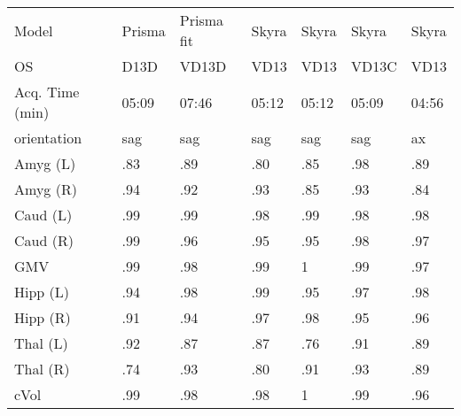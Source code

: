 \begin{table}
\begin{tabular}{lllllll}
Model                 &               Prisma &           Prisma fit &              Skyra &               Skyra &               Skyra &               Skyra \\
OS                    &                 D13D &                VD13D &               VD13 &                VD13 &               VD13C &                VD13 \\
Acq. Time (min)       &             05:09 &             07:46 &           05:12 &            05:12 &            05:09 &            04:56 \\
orientation           &                  sag &                  sag &                sag &                 sag &                 sag &                  ax \\
Amyg (L)              &                 .83 &                 .89 &               .80 &                .85 &                .98 &                .89 \\
Amyg (R)              &                 .94 &                 .92 &               .93 &                .85 &                .93 &                .84 \\
Caud (L)              &                 .99 &                 .99 &               .98 &                .99 &                .98 &                .98 \\
Caud (R)              &                 .99 &                 .96 &               .95 &                .95 &                .98 &                .97 \\
GMV                   &                 .99 &                 .98 &               .99 &                1   &                .99 &                .97 \\
Hipp (L)              &                 .94 &                 .98 &               .99 &                .95 &                .97 &                .98 \\
Hipp (R)              &                 .91 &                 .94 &               .97 &                .98 &                .95 &                .96 \\
Thal (L)              &                 .92 &                 .87 &               .87 &                .76 &                .91 &                .89 \\
Thal (R)              &                 .74 &                 .93 &               .80 &                .91 &                .93 &                .89 \\
cVol                  &                 .99 &                 .98 &               .98 &                1   &                .99 &                .96 \\

\end{tabular}
\end{table}
